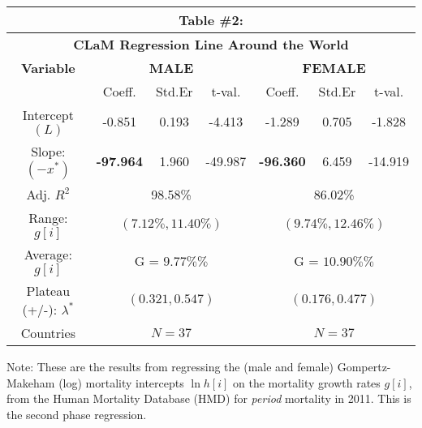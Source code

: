 \documentclass[12pt, titlepage]{article}%
\begin{document}
\clearpage
\begin{table}
\begin{center}
\begin{tabular}{||c||c|c|c|c|c|c||}\hline\hline
\multicolumn{7}{||c||}{Table \#2:} \\ \hline
\multicolumn{7}{||c||}{{\bf CLaM Regression Line Around the World}} \\ \hline
{\bf Variable} & \multicolumn{3}{|c|}{{\bf MALE}} & \multicolumn{3}{|c||}{{\bf FEMALE}} \\ \hline
& Coeff. & Std.Er & t-val. & Coeff. & Std.Er & t-val.  \\ \hline
Intercept $(L)$ & -0.851 & 0.193 & -4.413 & -1.289 & 0.705 & -1.828 \\ \hline
Slope: $(-x^{*})$ & {\bf-97.964} & 1.960 & -49.987 & {\bf-96.360} & 6.459 & -14.919 \\ \hline
Adj. $R^2$ & \multicolumn{3}{|c|}{98.58\%} & \multicolumn{3}{|c||}{86.02\%} \\ \hline
Range: $g[i]$ & \multicolumn{3}{|c|}{$(7.12\%, 11.40\%)$} & \multicolumn{3}{|c||}{$(9.74\%, 12.46\%)$} \\ \hline
Average: $g[i]$ & \multicolumn{3}{|c|}{G \; = \; $9.77\%\%$} & \multicolumn{3}{|c||}{G \; = \; $10.90\%\%$} \\ \hline
Plateau (+/-): $\lambda^{*}$ & \multicolumn{3}{|c|}{$ (0.321, 0.547)$} & \multicolumn{3}{|c||}{$ (0.176, 0.477)$} \\ \hline
Countries & \multicolumn{3}{|c|}{$N=37$} & \multicolumn{3}{|c||}{$N=37$} \\ \hline
\end{tabular}\label{tab3}\end{center}Note: These are the results from regressing the (male and female) Gompertz-Makeham (log) mortality intercepts $\ln h[i]$ on the mortality growth rates $g[i]$, from the Human Mortality Database (HMD) for {\em period} mortality in 2011. This is the second phase regression.
\end{table}
\end{document}
